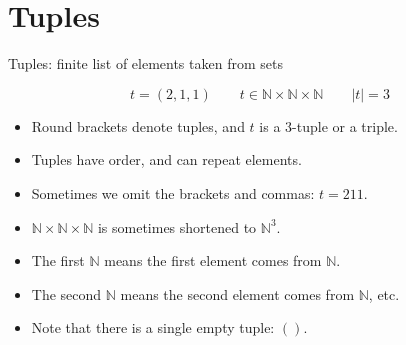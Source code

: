 \section{Tuples}

\begin{frame}{Tuples: finite list of elements taken from sets}
  \begin{topdisp}
    $$t = (2,1,1) \qquad t \in \mathbb{N} \times \mathbb{N} \times \mathbb{N} \qquad |t| = 3$$
  \end{topdisp}
  \begin{itemize}
    \setlength\itemsep{2mm}
    \item Round brackets denote tuples, and $t$ is a $3$-tuple or a triple.
    \item Tuples have order, and can repeat elements.
    \item Sometimes we omit the brackets and commas: $t = 211$.
    \item $\mathbb{N} \times \mathbb{N} \times \mathbb{N}$ is sometimes shortened to $\mathbb{N}^3$.
    \item The first $\mathbb{N}$ means the first element comes from $\mathbb{N}$.
    \item The second $\mathbb{N}$ means the second element comes from $\mathbb{N}$, etc.
    \item Note that there is a single empty tuple: $()$.
  \end{itemize}
\end{frame}


